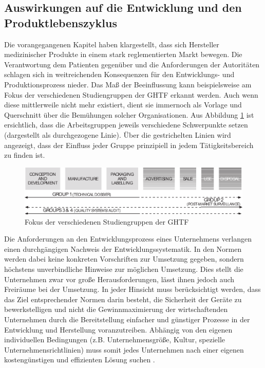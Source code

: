 \documentclass[a4paper,12pt]{report}
\begin{document}
\subsection{Auswirkungen auf die Entwicklung und den Produktlebenszyklus}\label{subsec:AuswirkungenAufEntwicklung}
Die vorangegangenen Kapitel haben klargestellt, dass sich Hersteller medizinischer Produkte in einem stark reglementierten Markt bewegen. Die Verantwortung dem Patienten gegenüber und die Anforderungen der Autoritäten schlagen sich in weitreichenden Konsequenzen für den Entwicklungs- und Produktionsprozess nieder. Das Maß der Beeinflussung kann beispielsweise am Fokus der verschiedenen Studiengruppen der GHTF erkannt werden. Auch wenn diese mittlerweile nicht mehr existiert, dient sie immernoch als Vorlage und Querschnitt über die Bemühungen solcher Organisationen. Aus Abbildung \ref{ghtf_focus} ist ersichtlich, dass die Arbeitsgruppen jeweils verschiedene Schwerpunkte setzen (dargestellt als durchgezogene Linie). Über die gestrichelten Linien wird angezeigt, dass der Einfluss jeder Gruppe prinzipiell in jedem Tätigkeitsbereich zu finden ist.
\begin{figure}[ht]
\centering
\includegraphics[width=1\textwidth]{Images/ghtf_focus}
\caption[Fokus der verschiedenen Studiengruppen der GHTF]{Fokus der verschiedenen Studiengruppen der GHTF \citep[S. 16]{Cheng2003}}
\label{ghtf_focus}
\end{figure}

Die Anforderungen an den Entwicklungsprozess eines Unternehmens verlangen einen durchgängigen Nachweis der Entwicklungssystematik. In den Normen werden dabei keine konkreten Vorschriften zur Umsetzung gegeben, sondern höchstens unverbindliche Hinweise zur möglichen Umsetzung. Dies stellt die Unternehmen zwar vor große Herausforderungen, lässt ihnen jedoch auch Freiräume bei der Umsetzung. In jeder Hinsicht muss berücksichtigt werden, dass das Ziel entsprechender Normen darin besteht, die Sicherheit der Geräte zu bewerkstelligen und nicht die Gewinnmaximierung der wirtschaftenden Unternehmen durch die Bereitstellung einfacher und günstiger Prozesse in der Entwicklung und Herstellung voranzutreiben. Abhängig von den eigenen individuellen Bedingungen (z.B. Unternehmensgröße, Kultur, spezielle Unternehmensrichtlinien) muss somit jedes Unternehmen nach einer eigenen kostengünstigen und effizienten Lösung suchen \citep[vgl.][S. 103-107]{Johner2015}.
\end{document}
